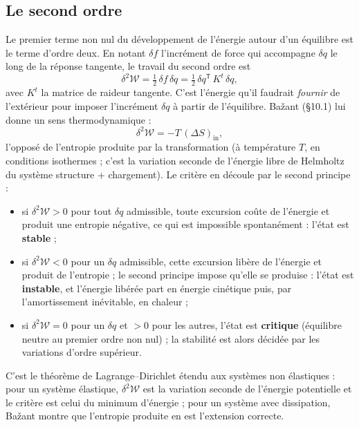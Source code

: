 \documentclass[11pt,a4paper]{article}
\newcommand{\dW}{\delta^2\mathcal W}
\begin{document}
\subsection{Le second ordre}
Le premier terme non nul du développement de l'énergie autour d'un équilibre est le terme
d'ordre deux. En notant $\delta f$ l'incrément de force qui accompagne $\delta q$ le long de la
réponse tangente, le travail du second ordre est
\begin{equation}
  \dW = \tfrac12\,\delta f\,\delta q = \tfrac12\,\delta q^{\mathsf T}\,K^t\,\delta q ,
\end{equation}
avec $K^t$ la matrice de raideur tangente. C'est l'énergie qu'il faudrait \emph{fournir} de
l'extérieur pour imposer l'incrément $\delta q$ à partir de l'équilibre. Bažant (§10.1) lui donne
un sens thermodynamique :
\begin{equation}
  \dW = -T\,(\Delta S)_{\text{in}} ,
\end{equation}
l'opposé de l'entropie produite par la transformation (à température $T$, en conditions
isothermes ; c'est la variation seconde de l'énergie libre de Helmholtz du système
structure + chargement). Le critère en découle par le second principe :
\begin{itemize}[nosep]
  \item si $\dW > 0$ pour tout $\delta q$ admissible, toute excursion coûte de l'énergie et
        produit une entropie négative, ce qui est impossible spontanément : l'état est
        \textbf{stable} ;
  \item si $\dW < 0$ pour un $\delta q$ admissible, cette excursion libère de l'énergie et produit
        de l'entropie ; le second principe impose qu'elle se produise : l'état est
        \textbf{instable}, et l'énergie libérée part en énergie cinétique puis, par
        l'amortissement inévitable, en chaleur ;
  \item si $\dW = 0$ pour un $\delta q$ et $> 0$ pour les autres, l'état est \textbf{critique}
        (équilibre neutre au premier ordre non nul) ; la stabilité est alors décidée par les
        variations d'ordre supérieur.
\end{itemize}
C'est le théorème de Lagrange--Dirichlet étendu aux systèmes non élastiques : pour un système
élastique, $\dW$ est la variation seconde de l'énergie potentielle et le critère est celui du
minimum d'énergie ; pour un système avec dissipation, Bažant montre que l'entropie produite
en est l'extension correcte.
\end{document}
